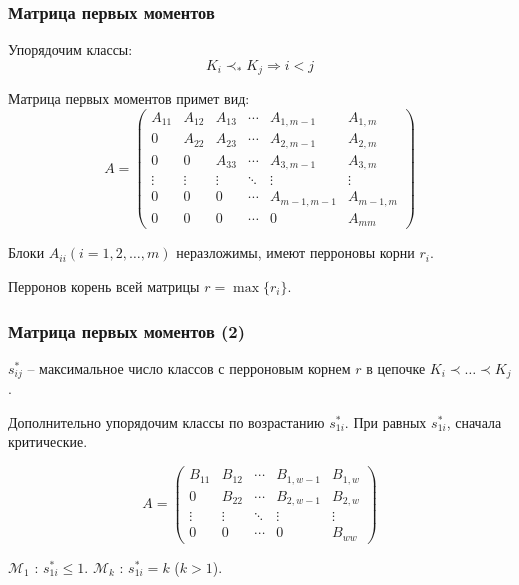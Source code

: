\documentclass{beamer}
\renewcommand{\leq}{\leqslant}
\begin{document}
	\begin{frame}
		\frametitle{Матрица первых моментов}

		Упорядочим классы:				
		\begin{equation*}
			K_i \prec_* K_j \Rightarrow i < j
		\end{equation*}
		
		Матрица первых моментов примет вид:
		\begin{equation*}
			A =
			\begin{pmatrix}
				A_{11} & A_{12} & A_{13} & \cdots & A_{1,m-1} & A_{1,m} \\
				0      & A_{22} & A_{23} & \cdots & A_{2,m-1} & A_{2,m} \\
				0      & 0      & A_{33} & \cdots & A_{3,m-1} & A_{3,m} \\
				\vdots & \vdots & \vdots & \ddots & \vdots & \vdots \\
				0      & 0      & 0      & \cdots & A_{m-1,m-1} & A_{m-1,m} \\
				0      & 0      & 0      & \cdots & 0      & A_{mm}
			\end{pmatrix}
		\end{equation*}
		
		Блоки $A_{ii} (i = 1,2,\ldots,m)$ неразложимы, имеют перроновы корни $r_i$.
		
		Перронов корень всей матрицы $r = \max\{r_i\}$.
	\end{frame}
	
	\begin{frame}
		\frametitle{Матрица первых моментов (2)}
		
		$s_{ij}^*$ -- максимальное число классов с перроновым корнем $r$ в цепочке $K_i \prec \ldots \prec K_j$.
		
		Дополнительно упорядочим классы по возрастанию $s_{1i}^*$. При равных $s_{1i}^*$, сначала критические.
		
		\begin{equation*}
		A =
		\begin{pmatrix}
		B_{11} & B_{12} & \cdots & B_{1,w-1} & B_{1,w} \\
		0      & B_{22} & \cdots & B_{2,w-1} & B_{2,w} \\
		\vdots & \vdots & \ddots & \vdots & \vdots \\
		0      & 0      & \cdots & 0      & B_{ww}
		\end{pmatrix}
		\end{equation*}

		$\mathcal{M}_1$ : $s_{1i}^* \leq 1$. $\mathcal{M}_k$ : $s_{1i}^* = k$ ($k > 1$).
	\end{frame}
	
\end{document}
